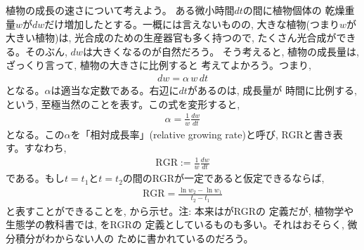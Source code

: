 \begin{exq}\label{q:funct_60_RGR} 植物の成長の速さについて考えよう。
ある微小時間$dt$の間に植物個体の
乾燥重量$w$が$dw$だけ増加したとする。一概には言えないものの, 
大きな植物(つまり$w$が大きい植物)は, 光合成のための生産器官も多く持つので, 
たくさん光合成ができる。そのぶん, $dw$は大きくなるのが自然だろう。
そう考えると, 植物の成長量は, ざっくり言って, 植物の大きさに比例すると
考えてよかろう。つまり, 
\begin{eqnarray}dw = \alpha\,w\,dt\end{eqnarray}
となる。$\alpha$は適当な定数である。右辺に$dt$があるのは, 成長量が
時間に比例する, という, 至極当然のことを表す。この式を変形すると, 
\begin{eqnarray}\alpha = \frac{1}{w}\frac{dw}{dt}\end{eqnarray}
となる。この$\alpha$を「相対成長率」(relative growing rate)と呼び, RGRと書き表す。すなわち, 
\begin{eqnarray}
\text{RGR}:=\frac{1}{w}\frac{dw}{dt}\label{eq:RGR_def}
\end{eqnarray}
である。もし$t=t_1$と$t=t_2$の間のRGRが一定であると仮定できるならば, 
\begin{eqnarray}
\text{RGR}=\frac{\ln w_2 - \ln w_1}{t_2 - t_1}\label{eq:RGR_log}
\end{eqnarray}
と表すことができることを, から示せ。注: 本来はがRGRの
定義だが, 植物学や生態学の教科書では, をRGRの
定義としているものも多い。それはおそらく, 微分積分がわからない人の
ために書かれているのだろう。\end{exq}
\mv

\hv


